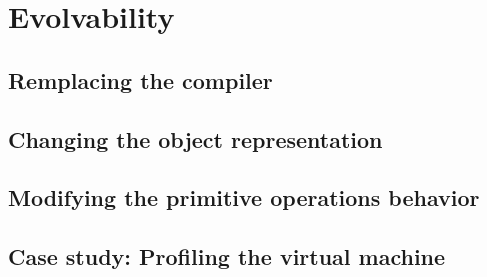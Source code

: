 \chapter{Evolvability}
\label{chap:Flexibility}

\section{Remplacing the compiler}

\section{Changing the object representation}

\section{Modifying the primitive operations behavior}

\section{Case study: Profiling the virtual machine}
